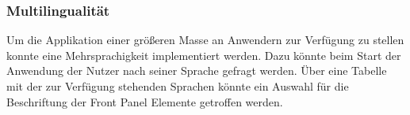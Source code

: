 


\subsubsection{Multilingualität}
Um die Applikation einer größeren Masse an Anwendern zur Verfügung zu stellen konnte eine Mehrsprachigkeit implementiert werden. Dazu könnte beim Start der Anwendung der Nutzer nach seiner Sprache gefragt werden. Über eine Tabelle mit der zur Verfügung stehenden Sprachen könnte ein Auswahl für die Beschriftung der Front Panel Elemente getroffen werden.

	


